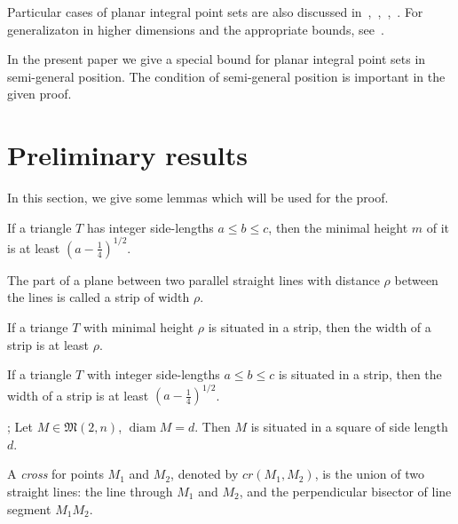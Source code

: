\documentclass[11pt,twoside,draft
]{article}
\theoremstyle{plain}
\begin{document}
Particular cases of planar integral point sets are also discussed
in~\cite[\S 5.11]{brass2006research},~\cite[\S D20]{guy2013unsolved},~\cite{our-pmm-2018},~\cite{our-ped-2018}.
For generalizaton in higher dimensions and the appropriate bounds, see~\cite{kurz2005characteristic,nozaki2013lower}.

In the present paper we give a special bound for planar integral point sets in semi-general position.
The condition of semi-general position is important in the given proof.



\section{Preliminary results}

In this section, we give some lemmas which will be used for the proof.


\begin{lemma}
	\cite[Observation 1]{solymosi2003note}
	If a triangle $T$ has integer side-lengths $a \leq b \leq c$,
	then the minimal height $m$ of it is at least $\left(a - \frac{1}{4}\right)^{1/2}$.
\end{lemma}

\begin{definition}
	The part of a plane between two parallel straight lines with distance $\rho$ between the lines
	is called a strip of width $\rho$.
\end{definition}

\begin{lemma}
	\cite{smurov1998stripcoverings}
	If a triange $T$ with minimal height $\rho$ is situated in a strip,
	then the width of a strip is at least $\rho$.
\end{lemma}

\begin{corollary}
	\label{cor:solymosi_strip}
	If a triangle $T$ with integer side-lengths $a \leq b \leq c$ is situated in a strip,
	then the width of a strip is at least $\left(a - \frac{1}{4}\right)^{1/2}$.
\end{corollary}


\begin{lemma}
	\cite[Lemma 4]{our-vmmsh-2018};
	\cite[Lemma 2.4]{my-pps-linear-bound-2019}
	\label{lem:square_container}
	Let $M\in\mathfrak{M}(2,n)$, $\operatorname{diam} M = d$.
	Then $M$ is situated in a square of side length $d$.
\end{lemma}

\begin{definition}
	\cite[Definition 2.5]{my-pps-linear-bound-2019}
	A \textit{cross} for points $M_1$ and $M_2$, denoted by $cr(M_1,M_2)$, is the union of two straight lines:
	the line through $M_1$ and $M_2$,
	and the perpendicular bisector of line segment $M_1 M_2$.
\end{definition}
\end{document}
